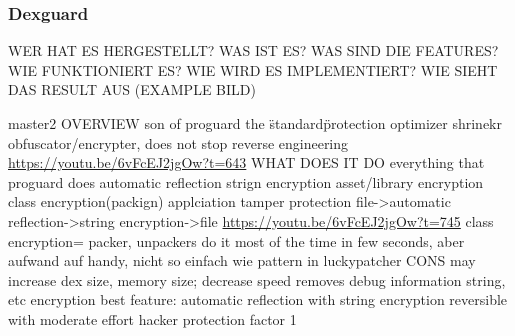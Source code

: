 \subsubsection{Dexguard} \label{subsubsection:counter-reengineering-optobf-dexguard}

WER HAT ES HERGESTELLT? WAS IST ES? WAS SIND DIE FEATURES? WIE FUNKTIONIERT ES? WIE WIRD ES IMPLEMENTIERT? WIE SIEHT DAS RESULT AUS (EXAMPLE BILD)\newline

master2\newline
OVERVIEW\newline
son of proguard\newline
the \"standard\" protection\newline
optimizer\newline
shrinekr\newline
obfuscator/encrypter, does not stop reverse engineering\newline
\url{https://youtu.be/6vFcEJ2jgOw?t=643}\newline
WHAT DOES IT DO\newline
everything that proguard does\newline
automatic reflection\newline
strign encryption\newline
asset/library encryption\newline
class encryption(packign)\newline
applciation tamper protection\newline
file->automatic reflection->string encryption->file\newline
\url{https://youtu.be/6vFcEJ2jgOw?t=745}\newline
class encryption= packer, unpackers do it most of the time in few seconds, aber aufwand auf handy, nicht so einfach wie pattern in luckypatcher\newline
CONS\newline
may increase dex size, memory size; decrease speed\newline
removes debug information\newline
string, etc encryption\newline
best feature: automatic reflection with string encryption\newline
reversible with moderate effort\newline
hacker protection factor 1\newline
